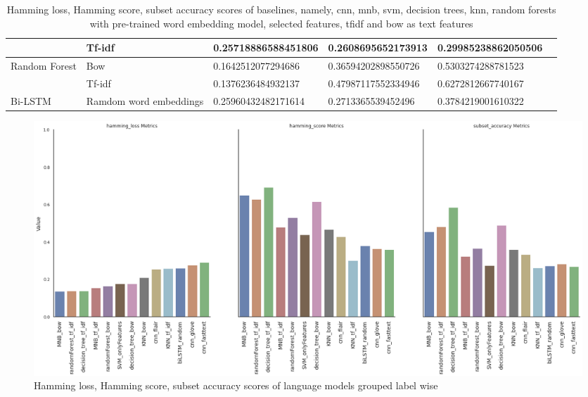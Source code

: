 \begin{table}[h!]
{\begin{tabular}{@{}llrrrr@{}}
\multicolumn{1}{|l|}{} &
  \multicolumn{1}{l|}{Tf-idf} &
  \multicolumn{1}{l|}{0.25718886588451806} &
  \multicolumn{1}{l|}{0.2608695652173913} &
  \multicolumn{1}{l|}{0.29985238862050506}  \\ \midrule
\multicolumn{1}{|l|}{\multirow{2}{*}{Random Forest}} &
  \multicolumn{1}{l|}{Bow} &
  \multicolumn{1}{l|}{0.1642512077294686} &
  \multicolumn{1}{l|}{0.36594202898550726} &
  \multicolumn{1}{l|}{0.5303274288781523} & \\ \cmidrule(l){2-5}
\multicolumn{1}{|l|}{} &
  \multicolumn{1}{l|}{Tf-idf} &
  \multicolumn{1}{l|}{0.1376236484932137} &
  \multicolumn{1}{l|}{0.47987117552334946} &
  \multicolumn{1}{l|}{0.6272812667740167} & \\ \midrule
\multicolumn{1}{|l|}{Bi-LSTM} &
  \multicolumn{1}{l|}{Ramdom word embeddings} &
  \multicolumn{1}{l|}{0.25960432482171614} &
  \multicolumn{1}{l|}{0.2713365539452496} &
  \multicolumn{1}{l|}{0.3784219001610322} \\ \bottomrule
\end{tabular}%
}
\caption{Hamming loss, Hamming score, subset accuracy scores of baselines, namely, \acrfull{cnn}, \acrfull{mnb}, \acrfull{svm}, decision trees, \acrfull{knn}, random forests with pre-trained word embedding model, selected features, \acrfull{tfidf} and \acrfull{bow} as text features}
\label{tab:sample_based_baseline}
\end{table}

\begin{figure}[h!]
    \centering
    \includegraphics[width=1\textwidth]{thesis/figures/HHAA_final.png}
    \caption{Hamming loss, Hamming score, subset accuracy scores of language models grouped label wise}
    \label{fig:label_wise_hhaa_baselines}
\end{figure}


